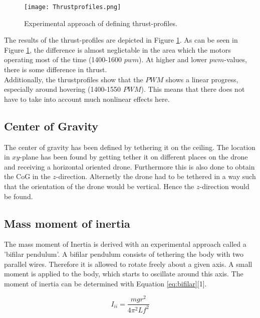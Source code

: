 \begin{figure}[H]
\centering
\texttt{[image: Thrustprofiles.png]}
\caption{Experimental approach of defining thrust-profiles.}
\label{fig:thrustprof}
\end{figure}

The results of the thrust-profiles are depicted in Figure \ref{fig:thrustprof}. As can be seen in Figure \ref{fig:thrustprof}, the difference is almost neglictable in the area which the motors operating most of the time (1400-1600 $pwm$). At higher and lower $pwm$-values, there is some difference in thrust.\\
Additionally, the thrustprofiles show that the $PWM$ shows a linear progress, especially around hovering (1400-1550 $PWM$). This means that there does not have to take into account much nonlinear effects here.

\subsection{Center of Gravity}
The center of gravity has been defined by tethering it on the ceiling. The location in $xy$-plane has been found by getting tether it on different places on the drone and receiving a horizontal oriented drone. Furthermore this is also done to obtain the CoG in the $z$-direction. Alternetly the drone had to be tethered in a way such that the orientation of the drone would be vertical. Hence the $z$-direction would be found.\\















\subsection{Mass moment of inertia}
The mass moment of Inertia is derived with an experimental approach called a 'bifilar pendulum'. A bifilar pendulum consists of tethering the body with two parallel wires. Therefore it is allowed to rotate freely about a given axis. A small moment is applied to the body, which starts to oscillate around this axis. The moment of inertia can be determined with Equation \ref{eq:bifilar}[1].

\begin{equation}
\label{eq:bifilar}
I_{ii}=\frac{mgr^2}{4 \pi^2 L f^2}
\end{equation}

